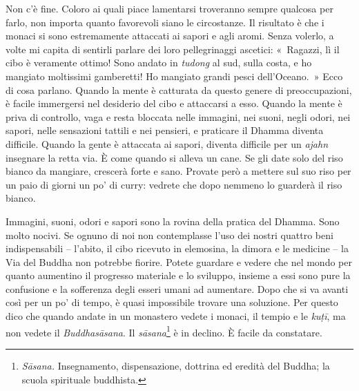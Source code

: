 Non c'è fine. Coloro ai quali piace lamentarsi troveranno sempre
qualcosa per farlo, non importa quanto favorevoli siano le circostanze.
Il risultato è che i monaci si sono estremamente attaccati ai sapori e
agli aromi. Senza volerlo, a volte mi capita di sentirli parlare dei
loro pellegrinaggi ascetici: «~Ragazzi, lì il cibo è veramente ottimo!
Sono andato in \emph{tudong} al sud, sulla costa, e ho mangiato
moltissimi gamberetti! Ho mangiato grandi pesci dell'Oceano.~» Ecco di
cosa parlano. Quando la mente è catturata da questo genere di
preoccupazioni, è facile immergersi nel desiderio del cibo e attaccarsi
a esso. Quando la mente è priva di controllo, vaga e resta bloccata
nelle immagini, nei suoni, negli odori, nei sapori, nelle sensazioni
tattili e nei pensieri, e praticare il Dhamma diventa difficile. Quando
la gente è attaccata ai sapori, diventa difficile per un \emph{ajahn}
insegnare la retta via. È come quando si alleva un cane. Se gli date
solo del riso bianco da mangiare, crescerà forte e sano. Provate però a
mettere sul suo riso per un paio di giorni un po' di curry: vedrete che
dopo nemmeno lo guarderà il riso bianco.

Immagini, suoni, odori e sapori sono la rovina della pratica del Dhamma.
Sono molto nocivi. Se ognuno di noi non contemplasse l'uso dei nostri
quattro beni indispensabili -- l'abito, il cibo ricevuto in elemosina,
la dimora e le medicine -- la Via del Buddha non potrebbe fiorire.
Potete guardare e vedere che nel mondo per quanto aumentino il progresso
materiale e lo sviluppo, insieme a essi sono pure la confusione e la
sofferenza degli esseri umani ad aumentare. Dopo che si va avanti così
per un po' di tempo, è quasi impossibile trovare una soluzione. Per
questo dico che quando andate in un monastero vedete i monaci, il tempio
e le \emph{kuṭī}, ma non vedete il \emph{Buddhasāsana}. Il
\emph{sāsana}\footnote{\emph{Sāsana.} Insegnamento, dispensazione,
  dottrina ed eredità del Buddha; la scuola spirituale buddhista.} è in
declino. È facile da constatare.

